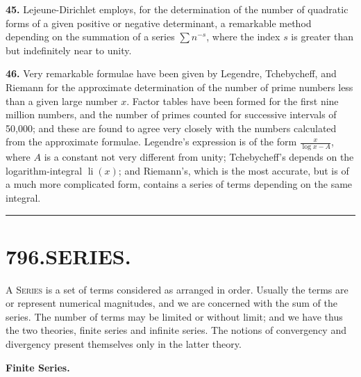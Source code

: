 \documentclass[11pt,a4paper]{book}
\begin{document}
\textbf{45.}\quad
Lejeune-Dirichlet employs, for the determination of the number of quadratic forms of a given positive or negative determinant, a remarkable method depending on the summation of a series $\sum n^{-s}$, where the index $s$ is greater than but indefinitely near to unity.

\textbf{46.}\quad
Very remarkable formulae have been given by Legendre, Tchebycheff, and Riemann for the approximate determination of the number of prime numbers less than a given large number $x$. Factor tables have been formed for the first nine million numbers, and the number of primes counted for successive intervals of 50,000; and these are found to agree very closely with the numbers calculated from the approximate formulae. Legendre's expression is of the form $\frac{x}{\log x - A}$, where $A$ is a constant not very different from unity; Tchebycheff's depends on the logarithm-integral $\operatorname{li}(x)$; and Riemann's, which is the most accurate, but is of a much more complicated form, contains a series of terms depending on the same integral.

\vspace{1em}
\hrule
\vspace{1em}



\section*{796.\quad SERIES.}


\smallskip

A \textsc{Series} is a set of terms considered as arranged in order. Usually the terms are or represent numerical magnitudes, and we are concerned with the sum of the series. The number of terms may be limited or without limit; and we have thus the two theories, finite series and infinite series. The notions of convergency and divergency present themselves only in the latter theory.

\bigskip
\noindent\textbf{Finite Series.}

\smallskip
\end{document}
